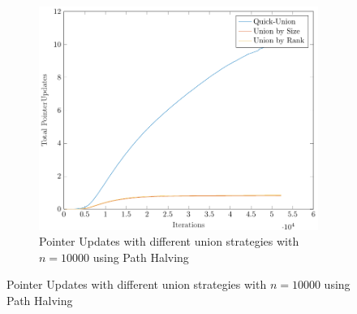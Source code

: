 \begin{figure}[ht]
\begin{subfigure}{0.32\textwidth}
    \end{subfigure}%
    \hfill
    \begin{subfigure}{0.32\textwidth}
        \centering
        \includegraphics[width=\textwidth]{../images/plotPHFull10000_PointerUpdates.pdf}
        \caption{Pointer Updates with different union strategies with $n = 10000$ using Path Halving}
    \end{subfigure}


\end{figure}
